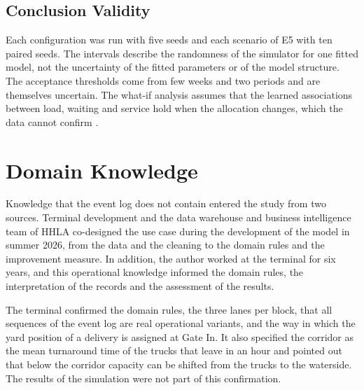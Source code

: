 \subsection{Conclusion Validity}
Each configuration was run with five seeds and each scenario of E5 with ten paired
seeds. The intervals describe the randomness of the simulator for one fitted model,
not the uncertainty of the fitted parameters or of the model structure. The
acceptance thresholds come from few weeks and two periods and are themselves
uncertain. The what-if analysis assumes that the learned associations between load,
waiting and service hold when the allocation changes, which the data cannot confirm
\cite{Vinci2026prosit}.

\section{Domain Knowledge }
\label{sec:disc_stakeholders}

Knowledge that the event log does not contain entered the study from two sources.
Terminal development and the data warehouse and business intelligence team of HHLA
co-designed the use case during the development of the model in summer 2026, from the
data and the cleaning to the domain rules and the improvement measure. In addition,
the author worked at the terminal for six years, and this operational knowledge
informed the domain rules, the interpretation of the records and the assessment of
the results.

The terminal confirmed the domain rules, the three lanes per block, that all
sequences of the event log are real operational variants, and the way in which the
yard position of a delivery is assigned at Gate In. It also specified the corridor as the mean
turnaround time of the trucks that leave in an hour and pointed out that below the
corridor capacity can be shifted from the trucks to the waterside. The results of the
simulation were not part of this confirmation.

